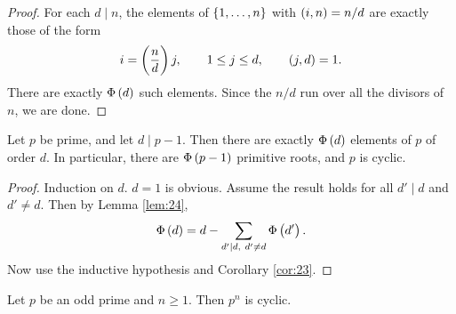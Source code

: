 \begin{proof}
For each $ d \mid n $, the elements of $ \cbr{1, \dots, n} $ with $ \br{i, n} = n / d $ are exactly those of the form
$$ i = \br{\dfrac{n}{d}}j, \qquad 1 \le j \le d, \qquad \br{j, d} = 1. $$
There are exactly $ \Phi\br{d} $ such elements. Since the $ n / d $ run over all the divisors of $ n $, we are done.
\end{proof}

\begin{theorem}
\label{thm:25}
Let $ p $ be prime, and let $ d \mid p - 1 $. Then there are exactly $ \Phi\br{d} $ elements of $ \unit{p} $ of order $ d $. In particular, there are $ \Phi\br{p - 1} $ primitive roots, and $ \unit{p} $ is cyclic.
\end{theorem}

\begin{proof}
Induction on $ d $. $ d = 1 $ is obvious. Assume the result holds for all $ d' \mid d $ and $ d' \ne d $. Then by Lemma \ref{lem:24},
$$ \Phi\br{d} = d - \sum_{d' \mid d, \ d' \ne d} \Phi\br{d'}. $$
Now use the inductive hypothesis and Corollary \ref{cor:23}.
\end{proof}


\begin{proposition}
Let $ p $ be an odd prime and $ n \ge 1 $. Then $ \unit{p^n} $ is cyclic.
\end{proposition}


